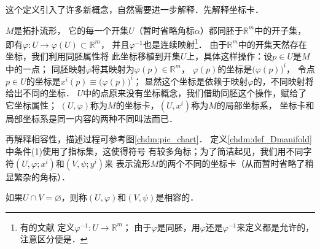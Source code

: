 这个定义引入了许多新概念，自然需要进一步解释．先解释坐标卡．

$M$是拓扑流形，%
它的每一个开集$U$（暂时省略角标$\alpha$）都同胚于$\mathbb{R}^m$中的开子集，
即有$\varphi:U \to \varphi( U) \subset \mathbb{R}^m$，
并且$\varphi^{-1}$也是连续映射{\footnote{有的文献
        定义$\varphi^{-1}:U \to \mathbb{R}^m$；
    由于$\varphi$是同胚，用$\varphi$还是$\varphi^{-1}$来定义都是允许的，注意区分便是．}}．
由于$\mathbb{R}^m$中的开集天然存在坐标，我们利用{\kaishu 同胚}属性将
此坐标移植到开集$U$上，具体这样操作：设$p\in U$是$M$中的一点；
同胚映射$\varphi$将其映射为$\varphi(p)\in \mathbb{R}^m$，
$\varphi(p)$的坐标是$\bigl(\varphi(p)\bigr)^i$，
令点$p\in U$的坐标是$x^i(p)\equiv \bigl(\varphi(p)\bigr)^i$；
显然这个坐标是依赖于映射$\varphi$的，不同映射将给出不同的坐标．
$U$中的点原来没有坐标概念，我们借助同胚这个操作，赋给了它坐标属性；
$(U, \varphi)$称为$M$的坐标卡，$(U,x^i)$称为$M$的{\heiti 局部坐标系}，
坐标卡和局部坐标系是同一内容的两种不同叫法而已．

再解释相容性，描述过程可参考图\ref{chdm:pic_chart}．
定义\ref{chdm:def_Dmanifold}中条件(1)使用了指标集，这使得符号
有较多角标；为了简洁起见，我们用不同字符$(U, \varphi;x^i)$和$(V, \psi;y^i)$来
表示流形$M$的两个不同的坐标卡（从而暂时省略了稍显繁杂的角标）．

如果$U \cap V = \varnothing $，则称$(U, \varphi)$和$(V, \psi)$是{\kaishu 相容的}．

